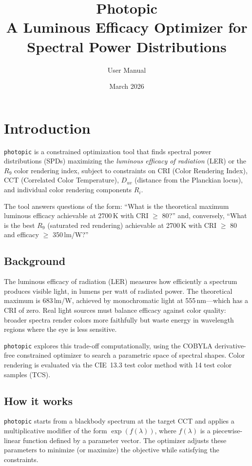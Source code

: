 \documentclass[11pt]{article}
\title{\textbf{Photopic} \\[0.3em]
  \large A Luminous Efficacy Optimizer for Spectral Power Distributions}
\author{User Manual}
\date{March 2026}
\newcommand{\photopic}{\texttt{photopic}}
\begin{document}
\maketitle

\tableofcontents
\newpage

\section{Introduction}
\label{sec:introduction}

\photopic{} is a constrained optimization tool that finds spectral power
distributions (SPDs) maximizing the \emph{luminous efficacy of radiation}
(LER) or the $R_9$ color rendering index, subject to constraints on CRI
(Color Rendering Index), CCT (Correlated Color Temperature), $D_{uv}$
(distance from the Planckian locus), and individual color rendering
components $R_i$.

The tool answers questions of the form: ``What is the theoretical maximum
luminous efficacy achievable at 2700\,K with CRI $\geq$ 80?'' and,
conversely, ``What is the best $R_9$ (saturated red rendering) achievable
at 2700\,K with CRI $\geq$ 80 and efficacy $\geq$ 350\,lm/W?''

\subsection{Background}

The luminous efficacy of radiation (LER) measures how efficiently a
spectrum produces visible light, in lumens per watt of radiated power.
The theoretical maximum is 683\,lm/W, achieved by monochromatic light at
555\,nm---which has a CRI of zero.  Real light sources must balance
efficacy against color quality: broader spectra render colors more
faithfully but waste energy in wavelength regions where the eye is less
sensitive.

\photopic{} explores this trade-off computationally, using the COBYLA
derivative-free constrained optimizer to search a parametric space of
spectral shapes.  Color rendering is evaluated via the CIE~13.3 test
color method with 14 test color samples (TCS).

\subsection{How it works}

\photopic{} starts from a blackbody spectrum at the target CCT and applies
a multiplicative modifier of the form $\exp(f(\lambda))$, where
$f(\lambda)$ is a piecewise-linear function defined by a parameter vector.
The optimizer adjusts these parameters to minimize (or maximize) the
objective while satisfying the constraints.
\end{document}
